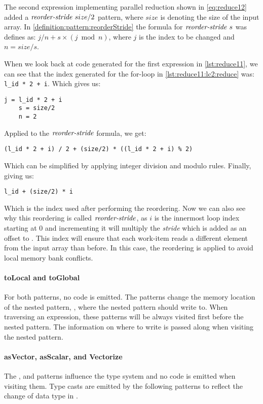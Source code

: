 The second expression implementing parallel reduction shown in \autoref{eq:reduce12} added a $\text{\textit{reorder-stride}}\ size/2$ pattern, where $size$ is denoting the size of the input array.
In \autoref{definition:pattern:reorderStride} the formula for $\text{\textit{reorder-stride}}\ s$ was defines as: $j / n + s \times (j \bmod{n})$, where $j$ is the index to be changed and $n = size / s$.

When we look back at \OpenCL code generated for the first expression in \autoref{lst:reduce11}, we can see that the index generated for the for-loop in \autoref{lst:reduce11:lc2:reduce} was:
\lstinline!l_id * 2 + i!.
Which gives us:
\begin{lstlisting}[numbers=none, frame=none]
    j = l_id * 2 + i
    s = size/2
    n = 2
\end{lstlisting}
Applied to the $\text{\textit{reorder-stride}}$ formula, we get:
\begin{lstlisting}[numbers=none, frame=none]
    (l_id * 2 + i) / 2 + (size/2) * ((l_id * 2 + i) % 2)
\end{lstlisting}
Which can be simplified by applying integer division and modulo rules. Finally, giving us:
\begin{lstlisting}[numbers=none, frame=none]
    l_id + (size/2) * i
\end{lstlisting}
Which is the index used after performing the reordering.
Now we can also see why this reordering is called $\text{\textit{reorder-stride}}$, as $i$ is the innermost loop index starting at $0$ and incrementing it will multiply the \emph{stride} which is added as an offset to .
This index will ensure that each work-item reads a different element from the input array than before.
In this case, the reordering is applied to avoid local memory bank conflicts.

\paragraph{{\footnotesize to}Local and {\footnotesize to}Global}
For both patterns, no \OpenCL code is emitted.
The patterns change the memory location of the nested pattern, \ie, where the nested pattern should write to.
When traversing an expression, these patterns will be always visited first before the nested pattern.
The information on where to write is passed along when visiting the nested pattern.

\paragraph{{\footnotesize as}Vector, {\footnotesize as}Scalar, and Vectorize}
The \asVector, and \asScalar patterns influence the type system and no \OpenCL code is emitted when visiting them.
Type casts are emitted by the following patterns to reflect the change of data type in \OpenCL.

